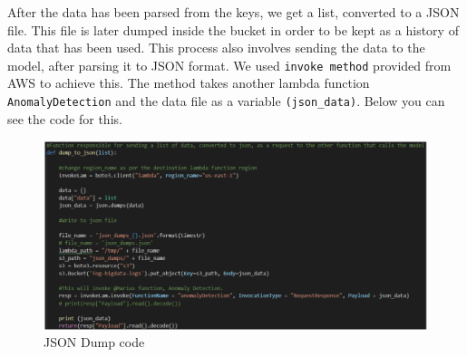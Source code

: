 After the data has been parsed from the keys, we get a list, converted to a JSON file. This file is later dumped inside the bucket in order to be kept as a history of data that has been used. 
This process also involves sending the data to the model, after parsing it to JSON format. We used \verb|invoke method| provided from AWS to achieve this. The method takes another lambda function \verb|AnomalyDetection| and the data file as a variable \verb|(json_data)|. Below you can see the code for this.

\begin{figure}[h!]
    \includegraphics[width=1\textwidth]{images/json-dump-code.png}
    \caption{JSON Dump code}
    \label{fig:json_dump_code}
\end{figure}

